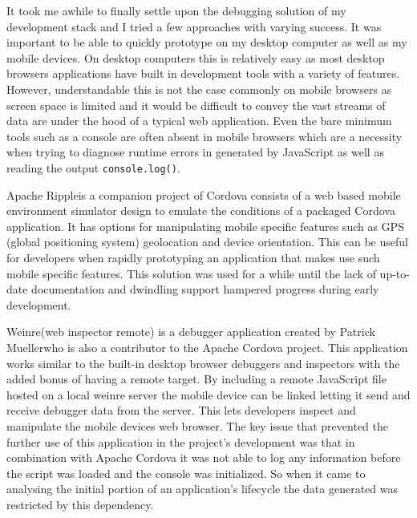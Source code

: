 \documentclass[final]{cmpreport}
\begin{document}

It took me awhile to finally settle upon the debugging solution of my development stack and I tried a few approaches with varying success. It was important to be able to quickly prototype on my desktop computer as well as my mobile devices. On desktop computers this is relatively easy as most desktop browsers applications have built in development tools with a variety of features. However, understandable this is not the case commonly on mobile browsers as screen space is limited and it would be difficult to convey the vast streams of data are under the hood of a typical web application. Even the bare minimum tools such as a console are often absent in mobile browsers which are a necessity when trying to diagnose runtime errors in generated by JavaScript as well as reading the output \texttt{console.log()}.

Apache Ripple\footnotemark is a companion project of Cordova consists of a web based mobile environment simulator design to emulate the conditions of a packaged Cordova application. It has options for manipulating mobile specific features such as GPS (global positioning system) geolocation and device orientation. This can be useful for developers when rapidly prototyping an application that makes use such mobile specific features. This solution was used for a while until the lack of up-to-date documentation and dwindling support hampered progress during early development.


Weinre\footnotemark (web inspector remote) is a debugger application created by Patrick Mueller\footnotemark who is also a contributor to the Apache Cordova project. This application works similar to the built-in desktop browser debuggers and inspectors with the added bonus of having a remote target. By including a remote JavaScript file hosted on a local weinre server the mobile device can be linked letting it send and receive debugger data from the server. This lets developers inspect and manipulate the mobile devices web browser. The key issue that prevented the further use of this application in the project's development was that in combination with Apache Cordova it was not able to log any information before the script was loaded and the console was initialized. So when it came to analysing the initial portion of an application's lifecycle the data generated was restricted by this dependency.
\end{document}
